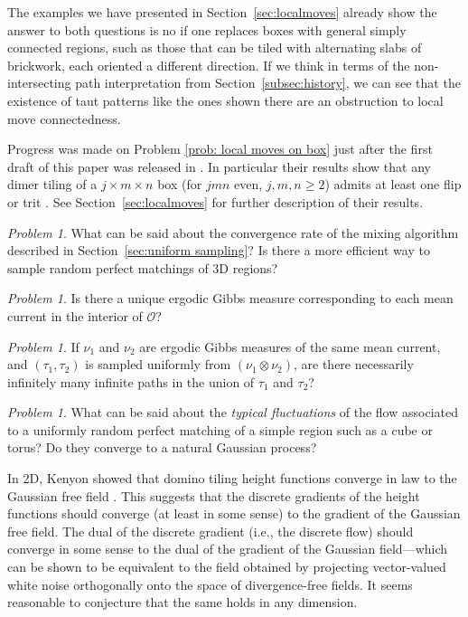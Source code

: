 \documentclass[11pt]{article}
\theoremstyle{remark}
\newtheorem{problem}[thm]{Problem}
\theoremstyle{definition}
\begin{document}
The examples we have presented in Section~\ref{sec:localmoves} already show the answer to both questions is no if one replaces boxes with general simply connected regions, such as those that can be tiled with alternating slabs of brickwork, each oriented a different direction. If we think in terms of the non-intersecting path interpretation from Section~\ref{subsec:history}, we can see that the existence of taut patterns like the ones shown there are an obstruction to local move connectedness.

Progress was made on Problem \ref{prob: local moves on box} just after the first draft of this paper was released in \cite{localdimer}. In particular their results show that any dimer tiling of a $j\times m \times n$ box (for $jmn$ even, $j,m,n\geq 2$) admits at least one flip or trit \cite[Theorem 1]{localdimer}. See Section~\ref{sec:localmoves} for further description of their results. 

\begin{problem}\label{prob: markov chain mixing time}
What can be said about the convergence rate of the mixing algorithm described in Section~\ref{sec:uniform sampling}? Is there a more efficient way to sample random perfect matchings of 3D regions?
\end{problem}

\begin{problem}\label{prob: unique EGM}
Is there a unique ergodic Gibbs measure corresponding to each mean current in the interior of $\mathcal O$?
\end{problem}

\begin{problem}\label{prob: infinite paths}
If $\nu_1$ and $\nu_2$ are ergodic Gibbs measures of the same mean current, and $(\tau_1, \tau_2)$ is sampled uniformly from $(\nu_1 \otimes \nu_2)$, are there necessarily infinitely many infinite paths in the union of $\tau_1$ and $\tau_2$?
\end{problem}

\begin{problem}
What can be said about the {\em typical fluctuations} of the flow associated to a uniformly random perfect matching of a simple region such as a cube or torus? Do they converge to a natural Gaussian process?
\end{problem}

In 2D, Kenyon showed that domino tiling height functions converge in law to the Gaussian free field \cite{kenyon2000conformal}. This suggests that the discrete gradients of the height functions should converge (at least in some sense) to the gradient of the Gaussian free field. The dual of the discrete gradient (i.e., the discrete flow) should converge in some sense to the dual of the gradient of the Gaussian field---which can be shown to be equivalent to the field obtained by projecting vector-valued white noise orthogonally onto the space of divergence-free fields.  It seems reasonable to conjecture that the same holds in any dimension.
\end{document}
